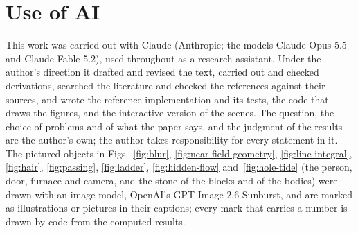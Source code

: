 \section*{Use of AI}\label{sec:ai-use}

This work was carried out with Claude (Anthropic; the models Claude Opus 5.5
and Claude Fable 5.2), used throughout as a research assistant. Under the
author's direction it drafted and revised the text, carried out and checked
derivations, searched the literature and checked the references against their
sources, and wrote the reference implementation and its tests, the code that
draws the figures, and the interactive version of the scenes. The question,
the choice of problems and of what the paper says, and the judgment of the
results are the author's own; the author takes responsibility for every
statement in it. The pictured objects in Figs.~\ref{fig:blur},
\ref{fig:near-field-geometry}, \ref{fig:line-integral}, \ref{fig:hair},
\ref{fig:passing}, \ref{fig:ladder}, \ref{fig:hidden-flow}
and~\ref{fig:hole-tide} (the person, door, furnace and camera, and the stone
of the blocks and of the bodies) were drawn with an image model,
OpenAI's GPT Image 2.6 Sunburst, and are marked as illustrations or pictures in their
captions; every mark that carries a number is drawn by code from the computed
results.
